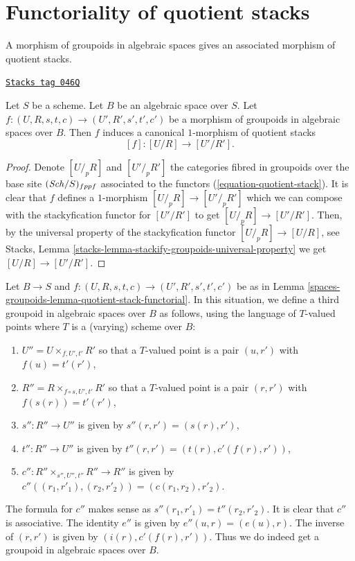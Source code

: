\section{Functoriality of quotient stacks}
\label{spaces-groupoids-section-functoriality-quotient-stacks}
A morphism of groupoids in algebraic spaces gives an associated morphism
of quotient stacks.

\begin{lemma}
\label{spaces-groupoids-lemma-quotient-stack-functorial}
\href{https://stacks.math.columbia.edu/tag/046Q}{\texttt{Stacks tag 046Q}}

Let $S$ be a scheme. Let $B$ be an algebraic space over $S$.
Let $f : (U, R, s, t, c) \to (U', R', s', t', c')$ be a morphism of
groupoids in algebraic spaces over $B$.
Then $f$ induces a canonical $1$-morphism of quotient stacks
$$
[f] : [U/R] \longrightarrow [U'/R'].
$$
\end{lemma}

\begin{proof}
Denote $[U/_{\!p}R]$ and $[U'/_{\!p}R']$ the categories fibred
in groupoids over the base site $(\mathit{Sch}/S)_{fppf}$ associated to the
functors (\ref{equation-quotient-stack}). It is clear that $f$ defines
a $1$-morphism $[U/_{\!p}R] \to [U'/_{\!p}R']$ which we can compose
with the stackyfication functor for $[U'/R']$ to get $[U/_{\!p}R] \to [U'/R']$.
Then, by the universal property of the stackyfication functor
$[U/_{\!p}R] \to [U/R]$, see
Stacks, Lemma \ref{stacks-lemma-stackify-groupoids-universal-property}
we get $[U/R] \to [U'/R']$.
\end{proof}

Let $B \to S$ and $f : (U, R, s, t, c) \to (U', R', s', t', c')$ be as in
Lemma \ref{spaces-groupoids-lemma-quotient-stack-functorial}.
In this situation, we define a third groupoid in algebraic spaces over
$B$ as follows, using the language of $T$-valued points where $T$
is a (varying) scheme over $B$:
\begin{enumerate}
\item $U'' = U \times_{f, U', t'} R'$ so that a $T$-valued point is
a pair $(u, r')$ with $f(u) = t'(r')$,
\item $R'' = R \times_{f \circ s, U', t'} R'$ so that a $T$-valued point is
a pair $(r, r')$ with $f(s(r)) = t'(r')$,
\item $s'' : R'' \to U''$ is given by $s''(r, r') = (s(r), r')$,
\item $t'' : R'' \to U''$ is given by $t''(r, r') = (t(r), c'(f(r), r'))$,
\item $c'' : R'' \times_{s'', U'', t''} R'' \to R''$ is given by
$c''((r_1, r'_1), (r_2, r'_2)) = (c(r_1, r_2), r'_2)$.
\end{enumerate}
The formula for $c''$ makes sense as $s''(r_1, r'_1) = t''(r_2, r'_2)$.
It is clear that $c''$ is associative. The identity $e''$ is given by
$e''(u, r) = (e(u), r)$. The inverse of $(r, r')$ is given by
$(i(r), c'(f(r), r'))$. Thus we do indeed get a groupoid
in algebraic spaces over $B$.


